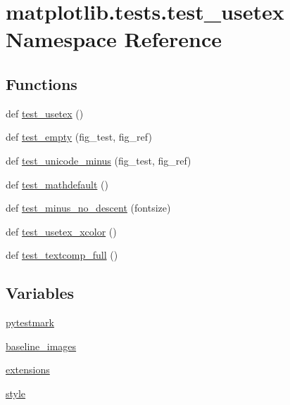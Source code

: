\hypertarget{namespacematplotlib_1_1tests_1_1test__usetex}{}\section{matplotlib.\+tests.\+test\+\_\+usetex Namespace Reference}
\label{namespacematplotlib_1_1tests_1_1test__usetex}
\subsection*{Functions}
\begin{DoxyCompactItemize}
\item 
def \hyperlink{namespacematplotlib_1_1tests_1_1test__usetex_abae2c3a945a4bad0370b6e6ee2c082c6}{test\+\_\+usetex} ()
\item 
def \hyperlink{namespacematplotlib_1_1tests_1_1test__usetex_a3ce9c44473ede9a0b30ba53ddf374730}{test\+\_\+empty} (fig\+\_\+test, fig\+\_\+ref)
\item 
def \hyperlink{namespacematplotlib_1_1tests_1_1test__usetex_ad918851ace55e045255a73f3b9768244}{test\+\_\+unicode\+\_\+minus} (fig\+\_\+test, fig\+\_\+ref)
\item 
def \hyperlink{namespacematplotlib_1_1tests_1_1test__usetex_aa819688bb71fb9ec8c36894959dc0ba2}{test\+\_\+mathdefault} ()
\item 
def \hyperlink{namespacematplotlib_1_1tests_1_1test__usetex_aa06a48eb7eda65764b8b874a65a49021}{test\+\_\+minus\+\_\+no\+\_\+descent} (fontsize)
\item 
def \hyperlink{namespacematplotlib_1_1tests_1_1test__usetex_a92307297bfee1aca91a669cb9c96f688}{test\+\_\+usetex\+\_\+xcolor} ()
\item 
def \hyperlink{namespacematplotlib_1_1tests_1_1test__usetex_a4f3926054316302bfa2f27c4f2bd403e}{test\+\_\+textcomp\+\_\+full} ()
\end{DoxyCompactItemize}
\subsection*{Variables}
\begin{DoxyCompactItemize}
\item 
\hyperlink{namespacematplotlib_1_1tests_1_1test__usetex_abc28a529d8be0c46e8d98eca331302d4}{pytestmark}
\item 
\hyperlink{namespacematplotlib_1_1tests_1_1test__usetex_a825bb5acb825350199976235f1cfe00f}{baseline\+\_\+images}
\item 
\hyperlink{namespacematplotlib_1_1tests_1_1test__usetex_adae9cfe6a158e9edd48b9fd6b59b9bdf}{extensions}
\item 
\hyperlink{namespacematplotlib_1_1tests_1_1test__usetex_a94a699914bba24bbf9db8d13866a814f}{style}
\end{DoxyCompactItemize}


